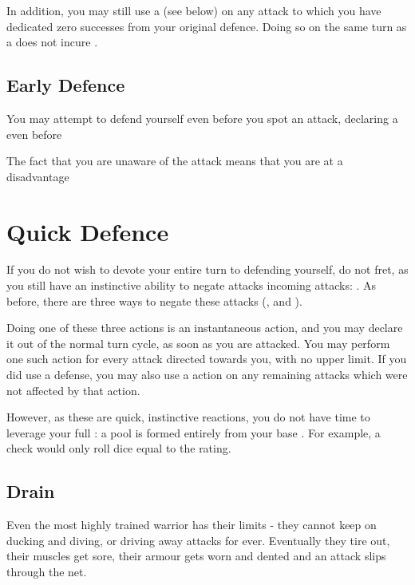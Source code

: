 In addition, you may still use a  (see below) on any attack to which you have dedicated zero successes from your original defence. Doing so on the same turn as a  does not incure . 

\subsection{Early Defence}

You may attempt to defend yourself even before you spot an attack, declaring a  even before 

The fact that you are unaware of the attack means that you are at a disadvantage

\section{Quick Defence}

If you do not wish to devote your entire turn to defending yourself, do not fret, as you still have an instinctive ability to negate attacks incoming attacks: . As before, there are three ways to negate these attacks (,  and ).

Doing one of these three actions is an instantaneous action, and you may declare it out of the normal turn cycle, as soon as you are attacked. You may perform one such action for every attack directed towards you, with no upper limit. If you did use a  defense, you may also use a  action on any remaining attacks which were not affected by that action.

However, as these are quick, instinctive reactions, you do not have time to leverage your full : a  pool is formed entirely from your base . For example, a  check would only roll dice equal to the  rating. 

\subsection{Drain}

Even the most highly trained warrior has their limits - they cannot keep on ducking and diving, or driving away attacks for ever. Eventually they tire out, their muscles get sore, their armour gets worn and dented and an attack slips through the net. 

